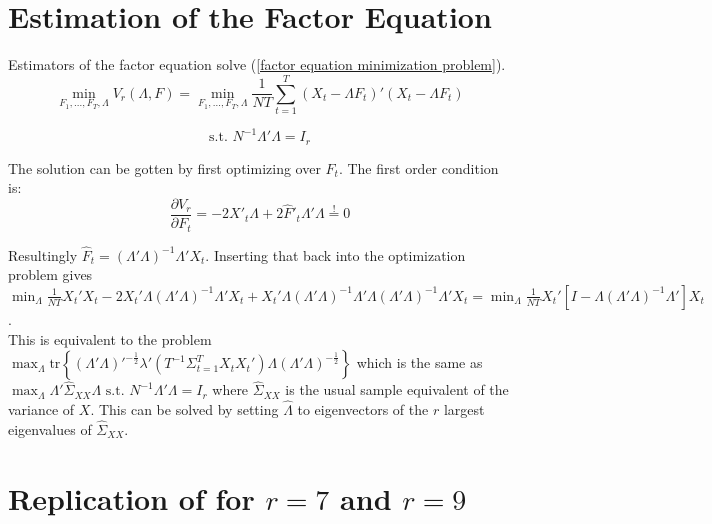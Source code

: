 \documentclass[12pt]{article}
\begin{document}
\newpage
\section{Estimation of the Factor Equation}
\label{Estimation of the Factor Equation}
Estimators of the factor equation solve (\ref{factor equation minimization problem}).
$$\min_{F_1, ..., F_T, \Lambda} V_r(\Lambda, F) = \min_{F_1, ..., F_T, \Lambda} \frac{1}{NT} \sum_{t=1}^T (X_t - \Lambda F_t)'(X_t - \Lambda F_t)$$

$$\text{s.t. } N^{-1} \Lambda' \Lambda = I_r$$

The solution can be gotten by first optimizing over $F_t$. The first order condition is: $$\frac{\partial V_r}{\partial F_t} = -2X'_t \Lambda + 2 \hat F'_t \Lambda' \Lambda \overset{!}{=} 0$$

Resultingly $\hat F_t = (\Lambda' \Lambda)^{-1} \Lambda' X_t$. Inserting that back into the optimization problem gives $\min_\Lambda \frac{1}{NT} X_t'X_t - 2X_t' \Lambda (\Lambda' \Lambda)^{-1} \Lambda'X_t + X_t' \Lambda (\Lambda' \Lambda)^{-1} \Lambda' \Lambda (\Lambda' \Lambda)^{-1} \Lambda'X_t = \min_\Lambda \frac{1}{NT} X_t' [I - \Lambda (\Lambda' \Lambda)^{-1} \Lambda']X_t$. \\
This is equivalent to the problem $\max_\Lambda \text{tr}\left\{(\Lambda'\Lambda)'^{-\frac{1}{2}}\lambda'(T^{-1} \Sigma_{t=1}^T X_tX_t') \Lambda (\Lambda' \Lambda)^{-\frac{1}{2}}\right\}$ which is the same as $\max_\Lambda \Lambda' \hat \Sigma_{XX} \Lambda \text{ s.t. } N^{-1} \Lambda' \Lambda = I_r$ where $\hat \Sigma_{XX}$ is the usual sample equivalent of the variance of $X$. This can be solved by setting $\hat \Lambda$ to eigenvectors of the $r$ largest eigenvalues of $\hat \Sigma_{XX}$.


\newpage
\section{Replication of \citet{bai2002determining} for $r=7$ and $r=9$}
\end{document}

